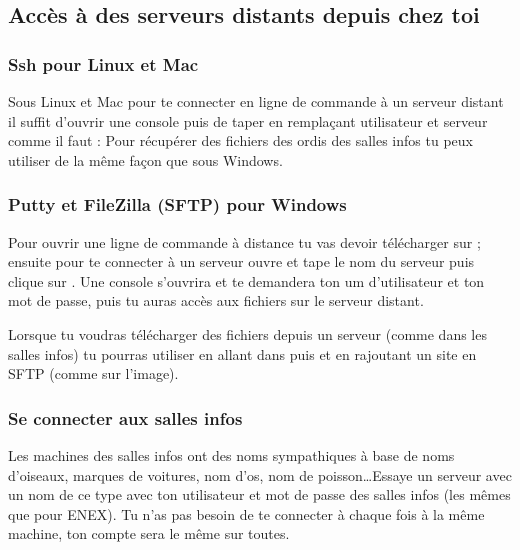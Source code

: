 \subsection{Acc\`es \`a des serveurs distants depuis chez toi}

\subsubsection{Ssh pour Linux et Mac}

Sous Linux et Mac pour te connecter en ligne de commande à un serveur distant il suffit d'ouvrir une console puis de taper en remplaçant utilisateur et serveur comme il faut :  Pour récupérer des fichiers des ordis des salles infos tu peux utiliser  de la même façon que sous Windows.

\subsubsection{Putty et FileZilla (SFTP) pour Windows}

Pour ouvrir une ligne de commande à distance tu vas devoir télécharger  sur \linebreak {} ;
ensuite pour te connecter à un serveur ouvre  et tape le nom du serveur puis clique sur .
Une console s'ouvrira et te demandera ton um d'utilisateur et ton mot de passe, puis tu auras accès aux fichiers sur le serveur distant.


Lorsque tu voudras télécharger des fichiers depuis un serveur (comme dans les salles infos) tu pourras utiliser  en allant dans  puis  et en rajoutant un site en SFTP (comme sur l'image).


\subsubsection{Se connecter aux salles infos}

Les machines des salles infos ont des noms sympathiques à base de noms d'oiseaux, marques de voitures, nom d'os, nom de poisson\dots Essaye un serveur avec un nom de ce type avec ton utilisateur et mot de passe des salles infos (les mêmes que pour ENEX). Tu n'as pas besoin de te connecter à chaque fois à la même machine, ton compte sera le même sur toutes. 

